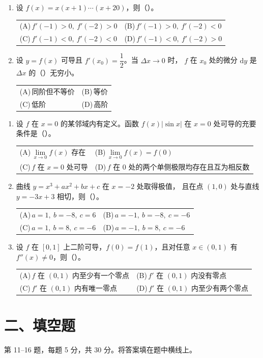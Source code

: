 \documentclass[UTF8,a4paper,zihao=-4,fontset=fandol]{ctexart}
\makeatletter
\renewcommand{\lim}{\operatorname*{lim}\limits}
\newcommand{\choices}[4]{%
  \par\vspace{0.15em}
  \begin{tabularx}{\linewidth}{@{}X@{\hspace{1em}}X@{}}
    \textup{(A)}\,#1 & \textup{(B)}\,#2 \\
    \textup{(C)}\,#3 & \textup{(D)}\,#4
  \end{tabularx}\par}
\makeatother
\begin{document}
\begin{enumerate}[itemsep=0.4em,topsep=0.5em]
  \item 设 $f(x)=x(x+1)\cdots(x+20)$，则（\quad）。
  \choices{$f'(-1)>0,\ f'(-2)>0$}{$f'(-1)>0,\ f'(-2)<0$}
          {$f'(-1)<0,\ f'(-2)<0$}{$f'(-1)<0,\ f'(-2)>0$}

  \item 设 $y=f(x)$ 可导且 $f'(x_0)=\dfrac12$。当 $\Delta x\to0$ 时，
  $f$ 在 $x_0$ 处的微分 $\mathrm{d}y$ 是 $\Delta x$ 的（\quad）无穷小。
  \choices{同阶但不等价}{等价}{低阶}{高阶}
\end{enumerate}

\newpage
\begin{enumerate}[start=8,itemsep=0.4em,topsep=0pt]
  \item 设 $f$ 在 $x=0$ 的某邻域内有定义。函数 $f(x)|\sin x|$ 在 $x=0$ 处可导的充要条件是（\quad）。
  \choices{$\displaystyle\lim_{x\to0}f(x)$ 存在}
          {$\displaystyle\lim_{x\to0}f(x)=f(0)$}
          {$f$ 在 $x=0$ 处可导}
          {$f$ 在 $0$ 处的两个单侧极限均存在且互为相反数}

  \item 曲线 $y=x^3+ax^2+bx+c$ 在 $x=-2$ 处取得极值，
  且在点 $(1,0)$ 处与直线 $y=-3x+3$ 相切，则（\quad）。
  \choices{$a=1,\ b=-8,\ c=6$}{$a=-1,\ b=-8,\ c=-6$}
          {$a=1,\ b=8,\ c=-6$}{$a=-1,\ b=8,\ c=-6$}

  \item 设 $f$ 在 $[0,1]$ 上二阶可导，$f(0)=f(1)$，且对任意 $x\in(0,1)$ 有
  $f''(x)\ne0$，则（\quad）。
  \choices{$f$ 在 $(0,1)$ 内至少有一个零点}{$f'$ 在 $(0,1)$ 内没有零点}
          {$f'$ 在 $(0,1)$ 内有唯一零点}{$f'$ 在 $(0,1)$ 内至少有两个零点}
\end{enumerate}

\section*{二、填空题}
第 11--16 题，每题 5 分，共 30 分。将答案填在题中横线上。
\end{document}
